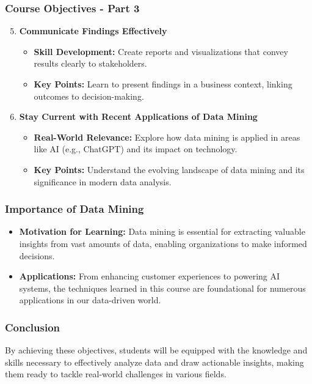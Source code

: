\documentclass[aspectratio=169]{beamer}
\begin{document}
\begin{frame}[fragile]
    \frametitle{Course Objectives - Part 3}
    \begin{enumerate} \setcounter{enumi}{4}
        \item \textbf{Communicate Findings Effectively}
        \begin{itemize}
            \item \textbf{Skill Development:} Create reports and visualizations that convey results clearly to stakeholders.
            \item \textbf{Key Points:} Learn to present findings in a business context, linking outcomes to decision-making.
        \end{itemize}

        \item \textbf{Stay Current with Recent Applications of Data Mining}
        \begin{itemize}
            \item \textbf{Real-World Relevance:} Explore how data mining is applied in areas like AI (e.g., ChatGPT) and its impact on technology.
            \item \textbf{Key Points:} Understand the evolving landscape of data mining and its significance in modern data analysis.
        \end{itemize}
    \end{enumerate}
\end{frame}

\begin{frame}[fragile]
    \frametitle{Importance of Data Mining}
    \begin{itemize}
        \item \textbf{Motivation for Learning:} Data mining is essential for extracting valuable insights from vast amounts of data, enabling organizations to make informed decisions.
        \item \textbf{Applications:} From enhancing customer experiences to powering AI systems, the techniques learned in this course are foundational for numerous applications in our data-driven world.
    \end{itemize}
\end{frame}

\begin{frame}[fragile]
    \frametitle{Conclusion}
    By achieving these objectives, students will be equipped with the knowledge and skills necessary to effectively analyze data and draw actionable insights, making them ready to tackle real-world challenges in various fields.
\end{frame}
\end{document}
